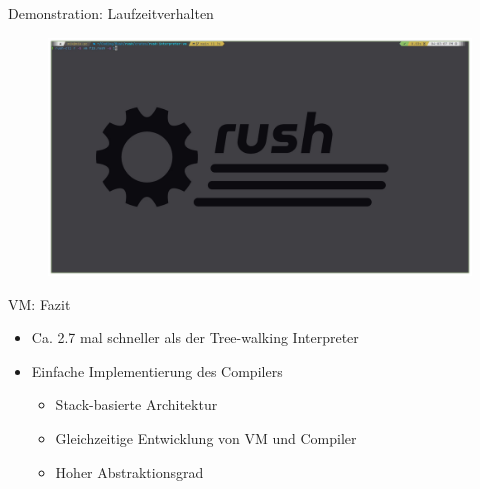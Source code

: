 \begin{frame}{Demonstration: Laufzeitverhalten}
	\begin{figure}[H]
		\href{run:assets/01_rush_presentation_vm.mkv}{
			\includegraphics[width=.95\textwidth]{assets/01_rush_presentation_vm.png}
		}
	\end{figure}
\end{frame}

\begin{frame}{VM: Fazit}
	\begin{itemize}
		\item Ca. 2.7 mal schneller als der Tree-walking Interpreter
		\item Einfache Implementierung des Compilers
		      \begin{itemize}
			      \item  Stack-basierte Architektur
			      \item Gleichzeitige Entwicklung von VM und Compiler
			      \item Hoher Abstraktionsgrad
		      \end{itemize}
	\end{itemize}
\end{frame}
